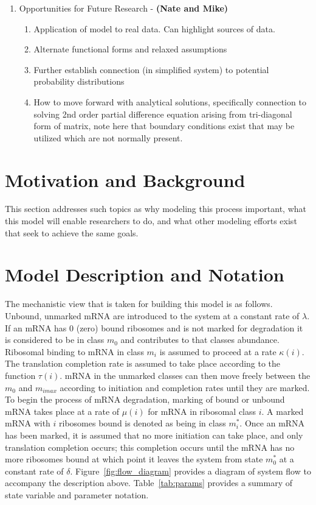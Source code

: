 \documentclass[review]{elsarticle}
\begin{document}
\begin{enumerate}
\begin{enumerate}
\end{enumerate}
\item Opportunities for Future Research  - \textbf{(Nate and Mike)}
\begin{enumerate}
\item Application of model to real data.
Can highlight sources of data.
\item Alternate functional forms and relaxed assumptions
\item Further establish connection (in simplified system) to potential probability distributions
\item How to move forward with analytical solutions, specifically connection to solving 2nd order partial difference equation arising from tri-diagonal form of matrix, note here that boundary conditions exist that may be utilized which are not normally present.
\end{enumerate}
\end{enumerate}
\newpage
\section{Motivation and Background}
This section addresses such topics as why modeling this process important, what this model will enable researchers to do, and what other modeling efforts exist that seek to achieve the same goals.

\section{Model Description and Notation}\label{sec:description}
The mechanistic view that is taken for building this model is as follows.
Unbound, unmarked mRNA are introduced to the system at a constant rate of $\lambda$.
If an mRNA has 0 (zero) bound ribosomes and is not marked for degradation it is considered to be in class $m_0$ and contributes to that classes abundance.
Ribosomal binding to mRNA in class $m_i$ is assumed to proceed at a rate $\kappa(i)$.
The translation completion rate is assumed to take place according to the function $\tau(i)$.  mRNA in the unmarked classes can then move freely between the $m_0$ and $m_{imax}$ according to initiation and completion rates until they are marked.
To begin the process of mRNA degradation, marking of bound or unbound mRNA takes place at a rate of $\mu(i)$ for mRNA in ribosomal class $i$.
A marked mRNA with $i$ ribosomes bound is denoted as being in class $m_i^*$.
Once an mRNA has been marked, it is assumed that no more initiation can take place, and only translation completion occurs; this completion occurs until the mRNA has no more ribosomes bound at which point it leaves the system from state $m_0^*$ at a constant rate of $\delta$.
Figure~\ref{fig:flow_diagram} provides a diagram of system flow to accompany the description above.
Table~\ref{tab:params} provides a summary of state variable and parameter notation.
\end{document}
